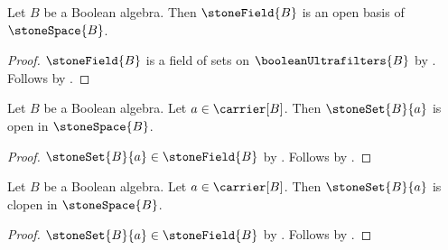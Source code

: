 \begin{theorem}\label{stone_field_is_open_basis}
    Let $B$ be a Boolean algebra.
    Then $\stoneField{B}$ is an open basis of $\stoneSpace{B}$.
\end{theorem}
\begin{proof}
    $\stoneField{B}$ is a field of sets on
        $\booleanUltrafilters{B}$ by
        .
    Follows by
        .
\end{proof}

\begin{proposition}\label{stone_set_is_open}
    Let $B$ be a Boolean algebra.
    Let $a\in\carrier[B]$.
    Then $\stoneSet{B}{a}$ is open in $\stoneSpace{B}$.
\end{proposition}
\begin{proof}
    $\stoneSet{B}{a}\in\stoneField{B}$ by
        .
    Follows by
        .
\end{proof}

\begin{proposition}\label{stone_set_is_clopen}
    Let $B$ be a Boolean algebra.
    Let $a\in\carrier[B]$.
    Then $\stoneSet{B}{a}$ is clopen in $\stoneSpace{B}$.
\end{proposition}
\begin{proof}
    $\stoneSet{B}{a}\in\stoneField{B}$ by
        .
    Follows by
        .
\end{proof}

